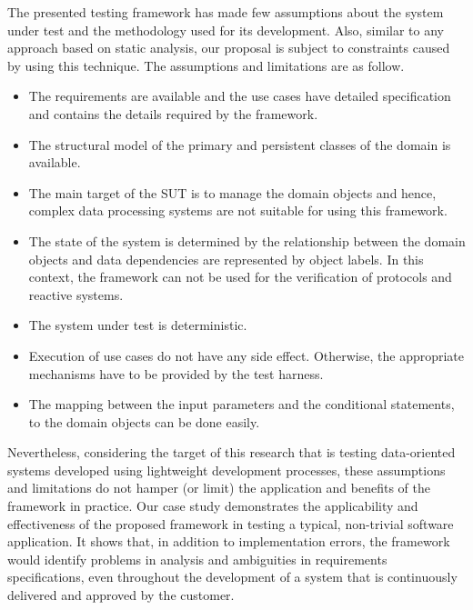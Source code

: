 %
%
\label{sec:discussion}
The presented testing framework has made few assumptions about the system under test and the methodology used for its development. Also, similar to any approach based on static analysis, our proposal is subject to constraints caused by using this technique. The assumptions and limitations are as follow.

\begin{itemize}
	\item The requirements are available and the use cases have detailed specification and contains the details required by the framework.
	
	\item The structural model of the primary and persistent classes of the domain is available.
	
	\item  The main target of the SUT is to manage the domain objects and hence, complex data processing systems are not suitable for using this framework.
	
	\item The state of the system is determined by the relationship between the domain objects and data dependencies are represented by object labels. In this context, the framework can not be used for the verification of protocols and reactive systems. 
	
	\item The system under test is deterministic.
	
	\item Execution of use cases do not have any side effect. Otherwise, the appropriate mechanisms have to be provided by the test harness.
	
	\item The mapping between the input parameters and the conditional statements, to the domain objects can be done easily.
\end{itemize}

Nevertheless, considering the target of this research that is testing data-oriented systems developed using lightweight development processes, these assumptions and limitations do not hamper (or limit) the application and benefits of the framework in practice. Our case study demonstrates the applicability and effectiveness of the proposed framework in testing a typical, non-trivial software application. It shows that, in addition to implementation errors, the framework would identify problems in analysis and ambiguities in requirements specifications, even throughout the development of a system that is continuously delivered and approved by the customer.

